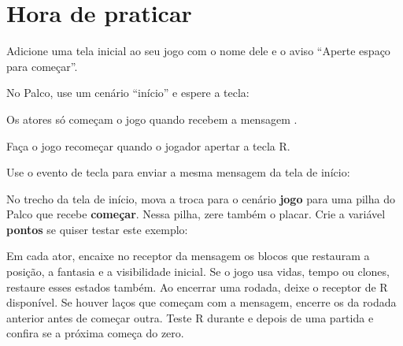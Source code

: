 \section{Hora de praticar}

\begin{exercicio}
Adicione uma tela inicial ao seu jogo com o nome dele e o aviso ``Aperte espaço para começar''.
\end{exercicio}

\begin{solucao}
No Palco, use um cenário ``início'' e espere a tecla:
\begin{pilha}
\end{pilha}
Os atores só começam o jogo quando recebem a mensagem .
\end{solucao}

\begin{exercicio}[Recomeçar]
Faça o jogo recomeçar quando o jogador apertar a tecla R.
\end{exercicio}

\begin{solucao}
Use o evento de tecla para enviar a mesma mensagem da tela de início:
\begin{pilha}
\end{pilha}
No trecho da tela de início, mova a troca para o cenário \textbf{jogo} para uma pilha do Palco que recebe \textbf{começar}. Nessa pilha, zere também o placar. Crie a variável \textbf{pontos} se quiser testar este exemplo:
\begin{pilha}
\end{pilha}
Em cada ator, encaixe no receptor da mensagem os blocos que restauram a posição, a fantasia e a visibilidade inicial. Se o jogo usa vidas, tempo ou clones, restaure esses estados também. Ao encerrar uma rodada, deixe o receptor de R disponível. Se houver laços que começam com a mensagem, encerre os da rodada anterior antes de começar outra. Teste R durante e depois de uma partida e confira se a próxima começa do zero.
\end{solucao}

